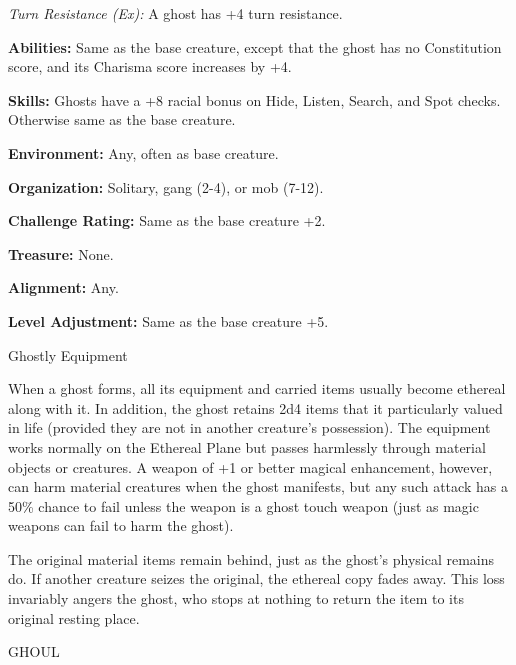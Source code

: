 \documentclass{article}
\begin{document}
\textit{Turn Resistance (Ex): }A ghost has +4 turn resistance.

\textbf{Abilities:} Same as the base creature, except that the ghost has no Constitution 
score, and its Charisma score increases by +4. 

\textbf{Skills:} Ghosts have a +8 racial bonus on Hide, Listen, Search, and Spot 
checks. Otherwise same as the base creature.

\textbf{Environment: }Any, often as base creature.

\textbf{Organization:} Solitary, gang (2-4), or mob (7-12).

\textbf{Challenge Rating: }Same as the base creature +2.

\textbf{Treasure: }None.

\textbf{Alignment: }Any.

\textbf{Level Adjustment: }Same as the base creature +5.

\vspace{12pt}
Ghostly Equipment

When a ghost forms, all its equipment and carried items usually become ethereal 
along with it. In addition, the ghost retains 2d4 items that it particularly valued 
in life (provided they are not in another creature's possession). The equipment 
works normally on the Ethereal Plane but passes harmlessly through material objects 
or creatures. A weapon of +1 or better magical enhancement, however, can harm material 
creatures when the ghost manifests, but any such attack has a 50\% chance to fail 
unless the weapon is a ghost touch weapon (just as magic weapons can fail to harm 
the ghost).

The original material items remain behind, just as the ghost's physical remains 
do. If another creature seizes the original, the ethereal copy fades away. This 
loss invariably angers the ghost, who stops at nothing to return the item to its 
original resting place.

\vspace{12pt}
{\LARGE{}GHOUL}
\end{document}
